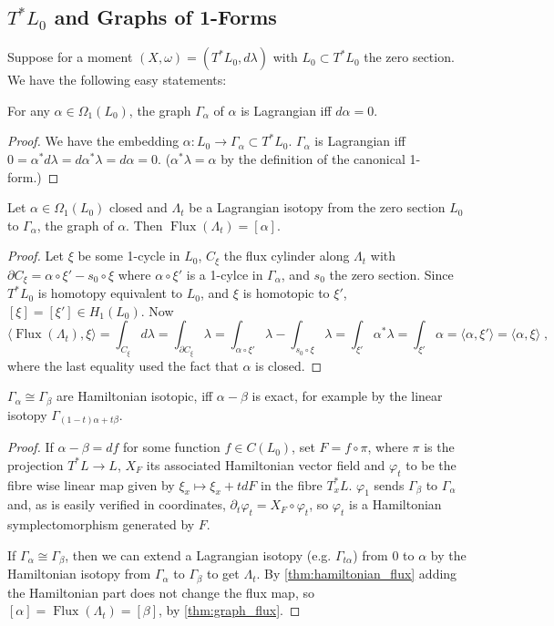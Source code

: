 \documentclass[12pt,a4paper,draft]{scrartcl}
\DeclareMathOperator{\Flux}{Flux}
\begin{document}
\subsection{\texorpdfstring{$T^* L_0$}{T*L} and Graphs of 1-Forms} 

Suppose for a moment $(X,ω)=(T^* L_0,d λ)$ with $L_0 ⊂ T^* L_0$ the zero section. We have the following easy statements:

\begin{lemma}
  \label{thm:graph_lagrangian}
  For any $α ∈ Ω_1(L_0)$, the graph $Γ_α$ of $α$ is Lagrangian iff $d α=0$.
\end{lemma}
\begin{proof}
  We have the embedding $α \colon L_0 → Γ_α ⊂ T^* L_0$. $Γ_α$ is Lagrangian iff $0 = α^* d λ = d α^* λ = d α = 0$. ($α^* λ = α$ by the definition of the canonical 1-form.)
\end{proof}

\begin{lemma}
  \label{thm:graph_flux}
  Let $α ∈ Ω_1(L_0)$ closed and $Λ_t$ be a Lagrangian isotopy from the zero section $L_0$ to $Γ_α$, the graph of $α$. Then $\Flux(Λ_t) = [α]$.
\end{lemma}
\begin{proof}
  Let $ξ$ be some 1-cycle in $L_0$, $C_ξ$ the flux cylinder along $Λ_t$ with $∂C_ξ = α ∘ ξ' - s_0 ∘ ξ$ where $α ∘ ξ'$ is a 1-cylce in $Γ_α$, and $s_0$ the zero section.
  Since $T^* L_0$ is homotopy equivalent to $L_0$, and $ξ$ is homotopic to $ξ'$, $[ξ] = [ξ'] ∈ H_1(L_0)$.
  Now
  \[⟨\Flux(Λ_t),ξ ⟩ = ∫_{C_ξ} dλ = ∫_{∂C_ξ} λ = ∫_{α ∘ ξ'}λ - ∫_{s_0 ∘ ξ} λ = ∫_{ξ'} α^* λ = ∫_{ξ'} α = ⟨α,ξ'⟩ = ⟨α,ξ⟩ \; ,\]
  where the last equality used the fact that $α$ is closed.
\end{proof}

\begin{lemma}
  \label{thm:graph_hamiltonian_isotopic}
  $Γ_α ≅ Γ_β$ are Hamiltonian isotopic, iff $α-β$ is exact, for example by the linear isotopy $Γ_{(1-t)α + t β}$.
\end{lemma}
\begin{proof}
  If $α-β = d f$ for some function $f ∈ C(L_0)$, set $F = f ∘ π$, where $π$ is the projection $T^*L → L$, $X_F$ its associated Hamiltonian vector field and $φ_t$ to be the fibre wise linear map given by $ξ_x ↦  ξ_x + tdF$ in the fibre $T_x^*L$.
  $φ_1$ sends $Γ_β$ to $Γ_α$ and, as is easily verified in coordinates, $∂_t φ_t = X_F ∘ φ_t$, so $φ_t$ is a Hamiltonian symplectomorphism generated by $F$.

  If $Γ_α ≅ Γ_β$, then we can extend a Lagrangian isotopy (e.g. $Γ_{tα}$) from $0$ to $α$ by the Hamiltonian isotopy from $Γ_α$ to $Γ_β$ to get $Λ_t$. By \cref{thm:hamiltonian_flux} adding the Hamiltonian part does not change the flux map, so $[α] = \Flux(Λ_t) = [β]$, by \cref{thm:graph_flux}.
\end{proof}
\end{document}
